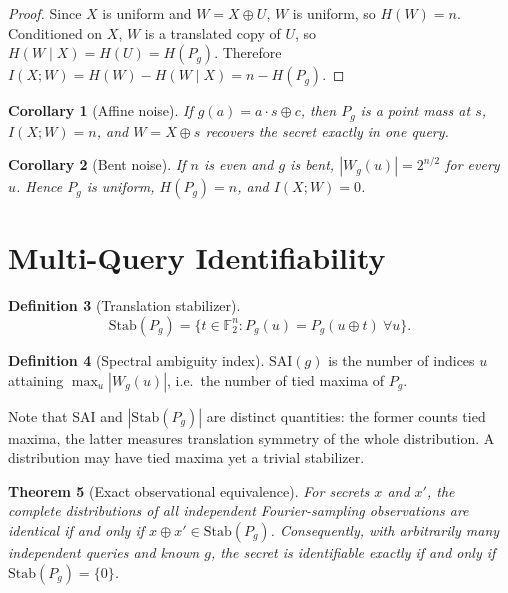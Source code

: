 \documentclass[10pt,twocolumn]{article}
\newtheorem{theorem}{Theorem}
\newtheorem{corollary}[theorem]{Corollary}
\theoremstyle{definition}
\newtheorem{definition}[theorem]{Definition}
\begin{document}
\begin{proof}
Since $X$ is uniform and $W = X \oplus U$, $W$ is uniform, so $H(W) = n$. Conditioned on $X$, $W$ is a translated copy of $U$, so $H(W \mid X) = H(U) = H(P_g)$. Therefore $I(X;W) = H(W) - H(W \mid X) = n - H(P_g)$.
\end{proof}

\begin{corollary}[Affine noise]\label{cor:affine}
If $g(a) = a \cdot s \oplus c$, then $P_g$ is a point mass at $s$, $I(X;W) = n$, and $W = X \oplus s$ recovers the secret exactly in one query.
\end{corollary}

\begin{corollary}[Bent noise]\label{cor:bent}
If $n$ is even and $g$ is bent, $|W_g(u)| = 2^{n/2}$ for every $u$. Hence $P_g$ is uniform, $H(P_g) = n$, and $I(X;W) = 0$.
\end{corollary}

\section{Multi-Query Identifiability}

\begin{definition}[Translation stabilizer]\label{def:stab}
\[ \mathrm{Stab}(P_g) = \{t \in \mathbb{F}_2^n : P_g(u) = P_g(u \oplus t)\ \forall u\}. \]
\end{definition}

\begin{definition}[Spectral ambiguity index]\label{def:sai}
$\mathrm{SAI}(g)$ is the number of indices $u$ attaining $\max_u |W_g(u)|$, i.e.\ the number of tied maxima of $P_g$.
\end{definition}

Note that $\mathrm{SAI}$ and $|\mathrm{Stab}(P_g)|$ are distinct quantities: the former counts tied maxima, the latter measures translation symmetry of the whole distribution. A distribution may have tied maxima yet a trivial stabilizer.

\begin{theorem}[Exact observational equivalence]\label{thm:stab}
For secrets $x$ and $x'$, the complete distributions of all independent Fourier-sampling observations are identical if and only if $x \oplus x' \in \mathrm{Stab}(P_g)$. Consequently, with arbitrarily many independent queries and known $g$, the secret is identifiable exactly if and only if $\mathrm{Stab}(P_g) = \{0\}$.
\end{theorem}
\end{document}
